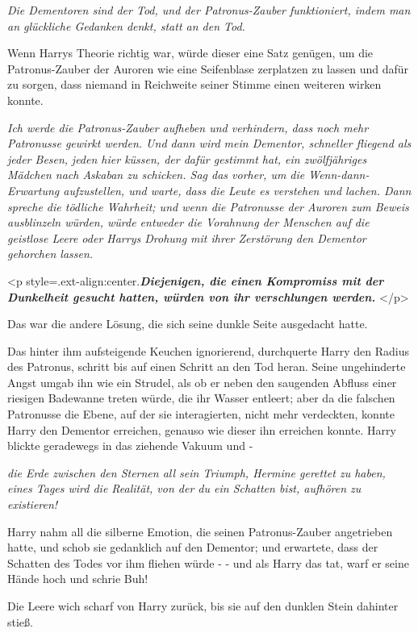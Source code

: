 \emph{Die Dementoren sind der Tod, und der Patronus-Zauber funktioniert, indem man an glückliche Gedanken denkt, statt an den Tod.}

Wenn Harrys Theorie richtig war, würde dieser eine Satz genügen, um die
Patronus-Zauber der Auroren wie eine Seifenblase zerplatzen zu lassen und dafür
zu sorgen, dass niemand in Reichweite seiner Stimme einen weiteren wirken
konnte.

\emph{Ich werde die Patronus-Zauber aufheben und verhindern, dass noch mehr
Patronusse gewirkt werden. Und dann wird mein Dementor, schneller fliegend als
jeder Besen, }\emph{jeden hier küssen, der dafür gestimmt hat, ein zwölfjähriges
Mädchen nach Askaban zu schicken. Sag das vorher, um die Wenn-dann-Erwartung
aufzustellen, und warte, dass die Leute es verstehen und lachen. Dann spreche
die tödliche Wahrheit; und wenn die Patronusse der Auroren zum Beweis
ausblinzeln würden, würde entweder die Vorahnung der Menschen auf die geistlose
Leere oder Harrys Drohung mit ihrer Zerstörung den Dementor gehorchen lassen. }

<p style=\grqq{}.ext-align:center\grqq{}.\textbf{\emph{Diejenigen, die einen
Kompromiss mit der Dunkelheit gesucht hatten, würden von ihr verschlungen
werden. }}</p>

Das war die andere Lösung, die sich seine dunkle Seite ausgedacht hatte.

Das hinter ihm aufsteigende Keuchen ignorierend, durchquerte Harry den Radius
des Patronus, schritt bis auf einen Schritt an den Tod heran. Seine ungehinderte
Angst umgab ihn wie ein Strudel, als ob er neben den saugenden Abfluss einer
riesigen Badewanne treten würde, die ihr Wasser entleert; aber da die falschen
Patronusse die Ebene, auf der sie interagierten, nicht mehr verdeckten, konnte
Harry den Dementor erreichen, genauso wie dieser ihn erreichen konnte. Harry
blickte geradewegs in das ziehende Vakuum und -

\emph{die Erde zwischen den Sternen all sein Triumph, Hermine gerettet zu haben, eines Tages wird die Realität, von der du ein Schatten bist, aufhören zu existieren! }

Harry nahm all die silberne Emotion, die seinen Patronus-Zauber angetrieben
hatte, und schob sie gedanklich auf den Dementor; und erwartete, dass der
Schatten des Todes vor ihm fliehen würde - - und als Harry das tat, warf er
seine Hände hoch und schrie \glqq Buh!\grqq{}

Die Leere wich scharf von Harry zurück, bis sie auf den dunklen Stein dahinter
stieß.

